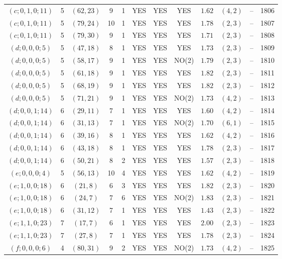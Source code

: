 \begin{longtable}{|c|c|c|c|c|c|c|c|c|c|c|c|}
$(c;0,1,0;11)$ & 5 & $(62,23)$ & 9 & 1 & YES & YES & YES & $1.62$ & $(4,2)$ & -- & 1806\\
$(c;0,1,0;11)$ & 5 & $(79,24)$ & 10 & 1 & YES & YES & YES & $1.78$ & $(2,3)$ & -- & 1807\\
$(c;0,1,0;11)$ & 5 & $(79,30)$ & 9 & 1 & YES & YES & YES & $1.71$ & $(2,3)$ & -- & 1808\\
$(d;0,0,0;5)$ & 5 & $(47,18)$ & 8 & 1 & YES & YES & YES & $1.73$ & $(2,3)$ & -- & 1809\\
$(d;0,0,0;5)$ & 5 & $(58,17)$ & 9 & 1 & YES & YES & NO(2) & $1.79$ & $(2,3)$ & -- & 1810\\
$(d;0,0,0;5)$ & 5 & $(61,18)$ & 9 & 1 & YES & YES & YES & $1.82$ & $(2,3)$ & -- & 1811\\
$(d;0,0,0;5)$ & 5 & $(68,19)$ & 9 & 1 & YES & YES & YES & $1.82$ & $(2,3)$ & -- & 1812\\
$(d;0,0,0;5)$ & 5 & $(71,21)$ & 9 & 1 & YES & YES & NO(2) & $1.73$ & $(4,2)$ & -- & 1813\\
$(d;0,0,1;14)$ & 6 & $(29,11)$ & 7 & 1 & YES & YES & YES & $1.60$ & $(4,2)$ & -- & 1814\\
$(d;0,0,1;14)$ & 6 & $(31,13)$ & 7 & 1 & YES & YES & NO(2) & $1.70$ & $(6,1)$ & -- & 1815\\
$(d;0,0,1;14)$ & 6 & $(39,16)$ & 8 & 1 & YES & YES & YES & $1.62$ & $(4,2)$ & -- & 1816\\
$(d;0,0,1;14)$ & 6 & $(43,18)$ & 8 & 1 & YES & YES & YES & $1.78$ & $(2,3)$ & -- & 1817\\
$(d;0,0,1;14)$ & 6 & $(50,21)$ & 8 & 2 & YES & YES & YES & $1.57$ & $(2,3)$ & -- & 1818\\
$(e;0,0,0;4)$ & 5 & $(56,13)$ & 10 & 4 & YES & YES & YES & $1.62$ & $(4,2)$ & -- & 1819\\
$(e;1,0,0;18)$ & 6 & $(21,8)$ & 6 & 3 & YES & YES & YES & $1.82$ & $(2,3)$ & -- & 1820\\
$(e;1,0,0;18)$ & 6 & $(24,7)$ & 7 & 6 & YES & YES & NO(2) & $1.83$ & $(2,3)$ & -- & 1821\\
$(e;1,0,0;18)$ & 6 & $(31,12)$ & 7 & 1 & YES & YES & YES & $1.43$ & $(2,3)$ & -- & 1822\\
$(e;1,1,0;23)$ & 7 & $(17,7)$ & 6 & 1 & YES & YES & YES & $2.00$ & $(2,3)$ & -- & 1823\\
$(e;1,1,0;23)$ & 7 & $(27,8)$ & 7 & 1 & YES & YES & YES & $1.78$ & $(2,3)$ & -- & 1824\\
$(f;0,0,0;6)$ & 4 & $(80,31)$ & 9 & 2 & YES & YES & NO(2) & $1.73$ & $(4,2)$ & -- & 1825\\

\end{longtable}
